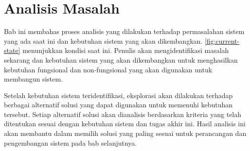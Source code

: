 \chapter{Analisis Masalah}
\label{chap:analisis-masalah}
Bab ini membahas proses analisis yang dilakukan terhadap permasalahan sistem yang ada saat ini dan kebutuhan sistem yang akan dikembangkan. \autoref{fig:current-state} menunjukkan kondisi saat ini. Penulis akan mengidentifikasi masalah sekarang dan kebutuhan sistem yang akan dikembangkan untuk menghasilkan kebutuhan fungsional dan non-fungsional yang akan digunakan untuk membangun sistem. 

Setelah kebutuhan sistem teridentifikasi, eksplorasi akan dilakukan terhadap berbagai alternatif solusi yang dapat digunakan untuk memenuhi kebutuhan tersebut. Setiap alternatif solusi akan dianalisis berdasarkan kriteria yang telah ditentukan sesuai dengan kebutuhan sistem dan tugas akhir ini. Hasil analisis ini akan membantu dalam memilih solusi yang paling sesuai untuk perancangan dan pengembangan sistem pada bab selanjutnya.





